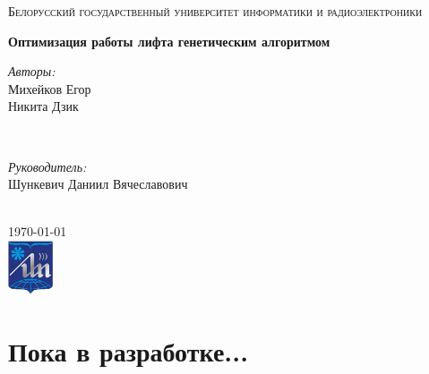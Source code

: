 \documentclass[11pt]{article}
\begin{document}
\begin{titlepage}

\center



\textsc{\LARGE Белорусский государственный университет информатики и радиоэлектроники}\\[1.5cm]

\vspace*{3cm}

{ \huge \bfseries Оптимизация работы лифта генетическим алгоритмом}\\[0.4cm] %

\vspace*{2cm}

\begin{minipage}{0.4\textwidth}
\begin{flushleft} \large
\emph{Авторы:}\\
Михейков Егор \\
Никита Дзик \\
\end{flushleft}
\end{minipage}
~
\begin{minipage}{0.4\textwidth}
\begin{flushright} \large
\emph{Руководитель:} \\
Шункевич Даниил Вячеславович \\
\end{flushright}
\end{minipage}\\[2cm]

{\large \today}\\[2cm]

\includegraphics[width=50px, keepaspectratio]{logo_rug.jpg}\\[1cm] %

\vfill %

\end{titlepage}

\section{Пока в разработке...}
\end{document}
